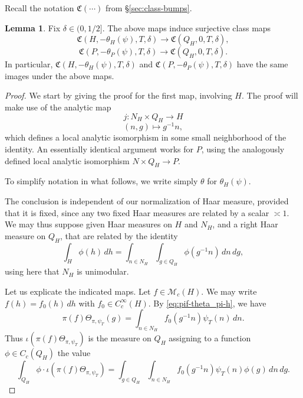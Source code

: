 \documentclass[reqno]{amsart}
\theoremstyle{plain} \newtheorem{theorem} {Theorem}
\theoremstyle{definition} \newtheorem{definition} [theorem] {Definition}
\theoremstyle{itplain} %
\newtheorem{lemma}[theorem]{Lemma}
\numberwithin{equation}{section}
\numberwithin{theorem}{section}
\begin{document}
Recall the notation $\mathfrak{C}(\dotsb)$ from \S\ref{sec:class-bumps}.
\begin{lemma}\label{lem:fix-delta-in}
  Fix $\delta \in (0,1/2]$.  The above maps induce surjective class maps
  \begin{equation*}
    \mathfrak{C}(H,-\theta_H(\psi),T,\delta) \rightarrow \mathfrak{C}(Q_H,0,T,\delta),
  \end{equation*}
  \begin{equation*}
    \mathfrak{C}(P,-\theta_P(\psi),T,\delta) \rightarrow \mathfrak{C}(Q_H,0,T,\delta).
  \end{equation*}
  In particular, $\mathfrak{C}(H,-\theta_H(\psi),T,\delta)$ and $\mathfrak{C}(P,-\theta_P(\psi),T,\delta)$ have the same images under the above maps.
\end{lemma}
\begin{proof}
  We start by giving the proof for the first map, involving $H$.  The proof will make use of the analytic map
  \begin{equation*}
    j : N_H \times Q_H \rightarrow H
  \end{equation*}
  \begin{equation*}
    (n,g) \mapsto g^{-1} n,
  \end{equation*}
  which defines a local analytic isomorphism in some small neighborhood of the identity.  An essentially identical argument works for $P$, using the analogously defined local analytic isomorphism $N \times Q_H \rightarrow P$.

  To simplify notation in what follows, we write simply $\theta$ for $\theta_H(\psi)$.

  The conclusion is independent of our normalization of Haar measure, provided that it is fixed, since any two fixed Haar measures are related by a scalar $\asymp 1$.  We may thus suppose given Haar measures on $H$ and $N_H$, and a right Haar measure on $Q_H$, that are related by the identity
  \begin{equation}\label{eq:int-_h-phih}
    \int _{H} \phi(h) \, d h
    =
    \int _{n \in N_H}
    \int _{g \in Q_H} \phi(g^{-1} n) \, d n \, d g,
  \end{equation}
  using here that $N_H$ is unimodular.

  Let us explicate the indicated maps.  Let $f \in \mathcal{M}_c(H)$.  We may write $f(h) = f_0(h) \, d h$ with $f_0 \in C_c^\infty(H)$.  By \eqref{eq:pif-theta_pi-h}, we have
  \begin{equation*}
    \pi(f) \Theta_{\pi,\psi_T}(g) =  \int _{n \in N_H} f_0(g^{-1} n ) \psi_T(n) \, d n.
  \end{equation*}
  Thus $\iota(\pi(f) \Theta_{\pi,\psi_T})$ is the measure on $Q_H$ assigning to a function $\phi \in C_c(Q_H)$ the value
  \begin{equation}\label{eq:int-_q_h-phi}
    \int _{Q_H} \phi \cdot \iota(\pi(f) \Theta_{\pi,\psi_T})
    =
    \int _{g \in Q_H}
    \int _{n \in N_H}
    f_0(g^{-1} n) \psi_T(n) \phi(g)
    \, d n
    \, d g.
  \end{equation}
  

\end{proof}
\end{document}
